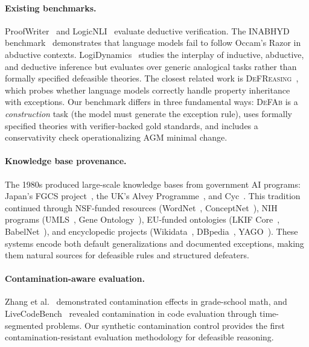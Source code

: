 \documentclass{article}
\theoremstyle{definition}
\begin{document}
\paragraph{Existing benchmarks.}
ProofWriter~\cite{tafjord2021proofwriter} and LogicNLI~\cite{tian2021diagnosing} evaluate deductive verification. The INABHYD benchmark~\cite{inabhyd2025} demonstrates that language models fail to follow Occam's Razor in abductive contexts. LogiDynamics~\cite{zheng2025logidynamics} studies the interplay of inductive, abductive, and deductive inference but evaluates over generic analogical tasks rather than formally specified defeasible theories. The closest related work is \textsc{DeFReasing}~\cite{allaway2025defreasing}, which probes whether language models correctly handle property inheritance with exceptions. Our benchmark differs in three fundamental ways: \textsc{DeFAb} is a \emph{construction} task (the model must generate the exception rule), uses formally specified theories with verifier-backed gold standards, and includes a conservativity check operationalizing AGM minimal change.

\paragraph{Knowledge base provenance.}
The 1980s produced large-scale knowledge bases from government AI programs: Japan's FGCS project~\cite{fuchi1984aiming, feigenbaum1993fgcs}, the UK's Alvey Programme~\cite{alvey1985ikbs}, and Cyc~\cite{lenat1990cyc, lenat1995cyc}. This tradition continued through NSF-funded resources (WordNet~\cite{miller1995wordnet}, ConceptNet~\cite{speer2017conceptnet}), NIH programs (UMLS~\cite{lindberg1993umls}, Gene Ontology~\cite{ashburner2000go}), EU-funded ontologies (LKIF Core~\cite{lkif2007}, BabelNet~\cite{navigli2012babelnet}), and encyclopedic projects (Wikidata~\cite{vrandecic2014wikidata}, DBpedia~\cite{lehmann2015dbpedia}, YAGO~\cite{suchanek2024yago}). These systems encode both default generalizations and documented exceptions, making them natural sources for defeasible rules and structured defeaters.

\paragraph{Contamination-aware evaluation.}
Zhang et al.~\cite{zhang2024gsm1k} demonstrated contamination effects in grade-school math, and LiveCodeBench~\cite{jain2025livecodebench} revealed contamination in code evaluation through time-segmented problems. Our synthetic contamination control provides the first contamination-resistant evaluation methodology for defeasible reasoning.
\end{document}
